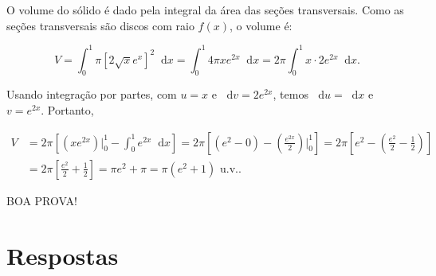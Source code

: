 \documentclass[12pt,a4paper]{article}
\newcommand*\diff{\mathop{}\!\mathrm{d}}
\begin{document}
\begin{ExerciseList}
O volume do sólido é dado pela integral da área das seções transversais. Como as seções transversais são discos com raio $f(x)$, o volume é:

\[
V = \int_0^1 \pi \left[2\sqrt{x}e^x\right]^2 \diff{x} = \int_0^1 4\pi x e^{2x} \diff{x} = 2\pi \int_0^1 x \cdot 2e^{2x} \diff{x}.
\]

Usando integração por partes, com \(u = x\) e \(\diff{v} = 2e^{2x}\), temos \(\diff{u} = \diff{x}\) e \(v = e^{2x}\). Portanto,

\begin{align*}
V
& = 2\pi \left[\left(x e^{2x} \right)\big|_0^1  - \int_0^1 e^{2x} \diff{x}\right]
= 2\pi \left[ (e^{2} - 0) - \left(\frac{e^{2x}}{2} \right)\bigg|_0^1\right]
= 2\pi \left[ e^{2} - \left(\frac{e^{2}}{2} - \frac{1}{2} \right)\right] \\
& =2\pi \left[ \frac{e^{2}}{2} + \frac{1}{2}\right]
= \pi e^{2} + \pi
= \boxed{\pi \left( e^2 + 1 \right) \text{ u.v.}}.
\end{align*}
\end{ExerciseList}

\vfill
\begin{center}
BOA PROVA!
\end{center}

\newpage
\restoregeometry
\section*{Respostas}
\shipoutAnswer
\end{document}
